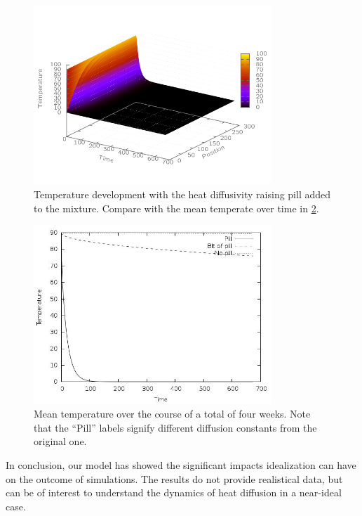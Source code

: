 \documentclass[a4paper,12pt]{article}
\theoremstyle{plain}
\theoremstyle{definition}
\begin{document}
   \begin{figure}[H]
      \centering
      \includegraphics[width=0.8\textwidth]{../script/01fig.png}
      \caption{Temperature development with the heat diffusivity raising pill
      added to the mixture. Compare with the mean temperate over time in
   \cref{fig:mean}.}
      \label{fig:01}
   \end{figure}       
   \begin{figure}[H]
      \centering
      \includegraphics[width=0.8\textwidth]{../script/all.png}
      \caption{Mean temperature over the course of a total of four weeks. Note
      that the ``Pill'' labels signify different diffusion constants from the
      original one.}
      \label{fig:mean}
   \end{figure}       

   In conclusion, our model has showed the significant impacts idealization can
   have on the outcome of simulations. The results do not provide realistical
   data, but can be of interest to understand the dynamics of heat diffusion in
   a near-ideal case. 
\end{document}
